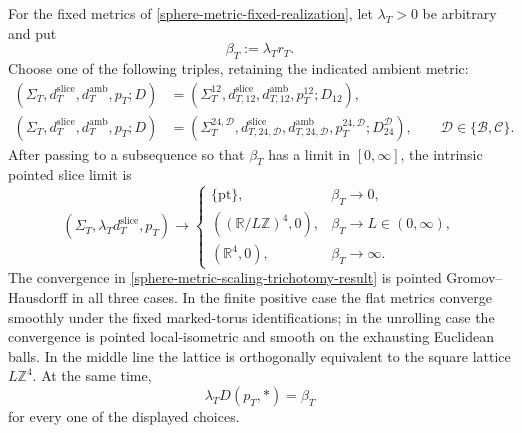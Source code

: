 \begin{theorem}
\label{sphere-metric-scaling-trichotomy}
For the fixed metrics of
\cref{sphere-metric-fixed-realization}, let \(\lambda_T>0\) be arbitrary
and put
\[
 \beta_T:=\lambda_Tr_T.
\]
Choose one of the following triples, retaining the indicated ambient
metric:
\[
 \begin{split}
  (\Sigma_T,d_T^{\mathrm{slice}},d_T^{\mathrm{amb}},p_T;D)
  &=(\Sigma_T^{12},d_{T,12}^{\mathrm{slice}},
      d_{T,12}^{\mathrm{amb}},p_T^{12};D_{12}),\\
  (\Sigma_T,d_T^{\mathrm{slice}},d_T^{\mathrm{amb}},p_T;D)
  &=(\Sigma_T^{24,\mathcal D},
      d_{T,24,\mathcal D}^{\mathrm{slice}},
      d_{T,24,\mathcal D}^{\mathrm{amb}},
      p_T^{24,\mathcal D};D_{24}^{\mathcal D}),
      \qquad \mathcal D\in\{\mathcal B,\mathcal C\}.
 \end{split}
\]
After passing to a subsequence so that \(\beta_T\) has a limit in
\([0,\infty]\), the intrinsic pointed slice limit is
\begin{equation}
 (\Sigma_T,\lambda_Td_T^{\mathrm{slice}},p_T)
 \longrightarrow
 \begin{cases}
  \{\mathrm{pt}\},&\beta_T\longrightarrow0,\\
  ((\mathbb R/L\mathbb Z)^4,0),
      &\beta_T\longrightarrow L\in(0,\infty),\\
  (\mathbb R^4,0),&\beta_T\longrightarrow\infty.
 \end{cases}
 \label{sphere-metric-scaling-trichotomy-result}
\end{equation}
The convergence in
\eqref{sphere-metric-scaling-trichotomy-result} is pointed
Gromov--Hausdorff in all three cases.  In the finite positive case the flat
metrics converge smoothly under the fixed marked-torus identifications; in
the unrolling case the convergence is pointed local-isometric and smooth on
the exhausting Euclidean balls.
In the middle line the lattice is orthogonally equivalent to the square
lattice \(L\mathbb Z^4\).  At the same time,
\begin{equation}
 \lambda_TD(p_T,*)=\beta_T
 \label{sphere-metric-vertex-distance}
\end{equation}
for every one of the displayed choices.


\end{theorem}
